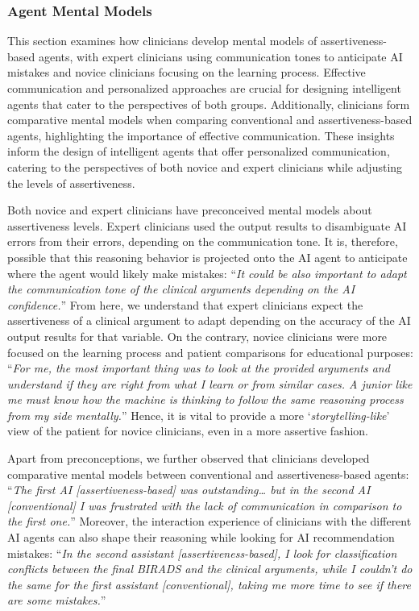 \subsubsection{Agent Mental Models}
\label{sec:app005007003002}

This section examines how clinicians develop mental models of assertiveness-based agents, with expert clinicians using communication tones to anticipate \ac{AI} mistakes and novice clinicians focusing on the learning process.
Effective communication and personalized approaches are crucial for designing intelligent agents that cater to the perspectives of both groups.
Additionally, clinicians form comparative mental models when comparing conventional and assertiveness-based agents, highlighting the importance of effective communication.
These insights inform the design of intelligent agents that offer personalized communication, catering to the perspectives of both novice and expert clinicians while adjusting the levels of assertiveness.

\textcolor{revised}{Both novice and expert clinicians have preconceived mental models about assertiveness levels.
Expert clinicians used the output results to disambiguate \ac{AI} errors from their errors, depending on the communication tone.}
It is, therefore, possible that this reasoning behavior is projected onto the \ac{AI} agent to anticipate where the agent would likely make mistakes:
``{\it It could be also important to adapt the communication tone of the clinical arguments depending on the \acs{AI} confidence.}''
\textcolor{revised}{From here, we understand that expert clinicians expect the assertiveness of a clinical argument to adapt depending on the accuracy of the \ac{AI} output results for that variable.}
On the contrary, novice clinicians were more focused on the learning process and patient comparisons for educational purposes:
``{\it For me, the most important thing was to look at the provided arguments and understand if they are right from what I learn or from similar cases.
A junior like me must know how the machine is thinking to follow the same reasoning process from my side mentally.}''
Hence, it is vital to provide a more `{\it storytelling-like}' view of the patient for novice clinicians, even in a more assertive fashion.

Apart from preconceptions, we further observed that clinicians developed comparative mental models between conventional and assertiveness-based agents:
``{\it The first \acs{AI} [assertiveness-based] was outstanding… but in the second \acs{AI} [conventional] I was frustrated with the lack of communication in comparison to the first one.}''
Moreover, the interaction experience of clinicians with the different \ac{AI} agents can also shape their reasoning while looking for \ac{AI} recommendation mistakes:
``{\it In the second assistant [assertiveness-based], I look for classification conflicts between the final BIRADS and the clinical arguments, while I couldn't do the same for the first assistant [conventional], taking me more time to see if there are some mistakes.}''

